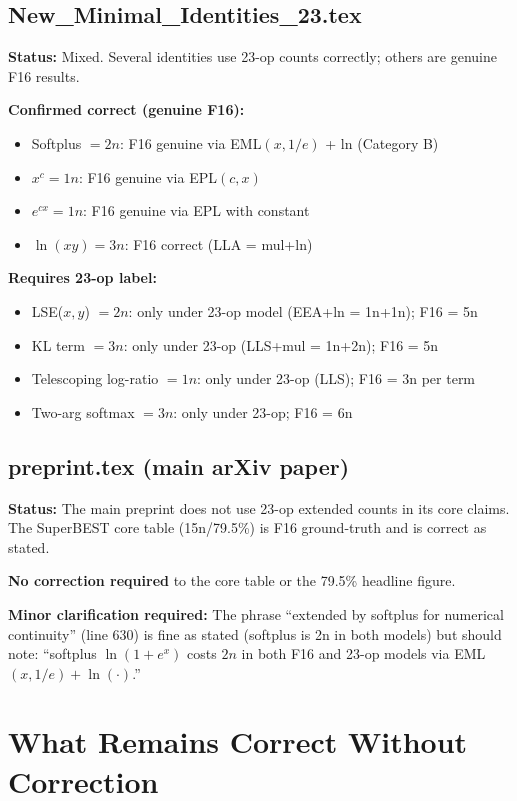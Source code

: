 \documentclass[11pt]{article}
\begin{document}
\subsection{New\_Minimal\_Identities\_23.tex}

\textbf{Status:} Mixed. Several identities use 23-op counts correctly;
others are genuine F16 results.

\textbf{Confirmed correct (genuine F16):}
\begin{itemize}
  \item Softplus $= 2n$: F16 genuine via EML$(x, 1/e)$ + ln (Category B)
  \item $x^c = 1n$: F16 genuine via EPL$(c, x)$
  \item $e^{cx} = 1n$: F16 genuine via EPL with constant
  \item $\ln(xy) = 3n$: F16 correct (LLA = mul+ln)
\end{itemize}

\textbf{Requires 23-op label:}
\begin{itemize}
  \item LSE($x,y$) $= 2n$: only under 23-op model (EEA+ln = 1n+1n); F16 = 5n
  \item KL term $= 3n$: only under 23-op (LLS+mul = 1n+2n); F16 = 5n
  \item Telescoping log-ratio $= 1n$: only under 23-op (LLS); F16 = 3n per term
  \item Two-arg softmax $= 3n$: only under 23-op; F16 = 6n
\end{itemize}

\subsection{preprint.tex (main arXiv paper)}

\textbf{Status:} The main preprint does not use 23-op extended counts in its
core claims. The SuperBEST core table (15n/79.5\%) is F16 ground-truth and
is correct as stated.

\textbf{No correction required} to the core table or the 79.5\% headline figure.

\textbf{Minor clarification required:} The phrase
``extended by softplus for numerical continuity'' (line 630) is fine as stated
(softplus is 2n in both models) but should note:
``softplus $\ln(1+e^x)$ costs $2n$ in both F16 and 23-op models via
EML$(x, 1/e) + \ln(\cdot)$.''

\section{What Remains Correct Without Correction}
\end{document}
